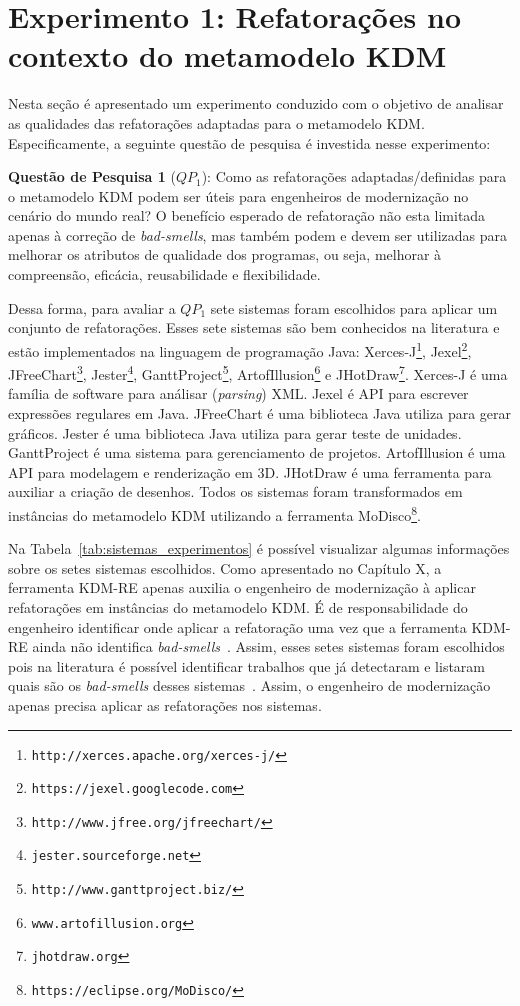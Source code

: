\section{Experimento 1: Refatorações no contexto do metamodelo KDM}\label{sec:experimento}

Nesta seção é apresentado um experimento conduzido com o objetivo de analisar as qualidades das refatorações adaptadas para o metamodelo KDM. Especificamente, a seguinte questão de pesquisa é investida nesse experimento:

\textbf{Questão de Pesquisa 1} (\textbf{$QP_1$}): Como as refatorações adaptadas/definidas para o metamodelo KDM podem ser úteis para engenheiros de modernização no cenário do mundo real? O benefício esperado de refatoração não esta limitada apenas à correção de \textit{bad-smells}, mas também podem e devem ser utilizadas para melhorar os atributos de qualidade dos programas, ou seja, melhorar à compreensão, eficácia, reusabilidade e flexibilidade.


Dessa forma, para avaliar a \textbf{$QP_1$} sete sistemas foram escolhidos para aplicar um conjunto de refatorações. Esses sete sistemas são bem conhecidos na literatura e estão implementados na linguagem de programação Java: Xerces-J\footnote{\texttt{http://xerces.apache.org/xerces-j/}}, Jexel\footnote{\texttt{https://jexel.googlecode.com}}, JFreeChart\footnote{\texttt{http://www.jfree.org/jfreechart/}}, Jester\footnote{\texttt{jester.sourceforge.net}}, GanttProject\footnote{\texttt{http://www.ganttproject.biz/}}, ArtofIllusion\footnote{\texttt{www.artofillusion.org}} e JHotDraw\footnote{\texttt{jhotdraw.org}}. Xerces-J é uma família de software para análisar (\textit{parsing}) XML. Jexel é API para escrever expressões regulares em Java. JFreeChart é uma biblioteca Java utiliza para gerar gráficos. Jester é uma biblioteca Java utiliza para gerar teste de unidades. GanttProject é uma sistema para gerenciamento de projetos. ArtofIllusion é uma API para modelagem e renderização em 3D. JHotDraw é uma ferramenta para auxiliar a criação de desenhos. Todos os sistemas foram transformados em instâncias do metamodelo KDM utilizando a ferramenta MoDisco\footnote{\texttt{https://eclipse.org/MoDisco/}}. 

Na Tabela~\ref{tab:sistemas_experimentos} é possível visualizar algumas informações sobre os setes sistemas escolhidos. Como apresentado no Capítulo X, a ferramenta KDM-RE apenas auxilia o engenheiro de modernização à aplicar refatorações em instâncias do metamodelo KDM. É de responsabilidade do engenheiro identificar onde aplicar a refatoração uma vez que a ferramenta KDM-RE ainda não identifica \textit{bad-smells}~\cite{Fowler1999}. Assim, esses setes sistemas foram escolhidos pois na literatura é possível identificar trabalhos que já detectaram e listaram quais são os \textit{bad-smells} desses sistemas~\cite{Kessentini_2011, Ouni_2013, Moha_2010, Kessentini_2010}. Assim, o engenheiro de modernização apenas precisa aplicar as refatorações nos sistemas.  


